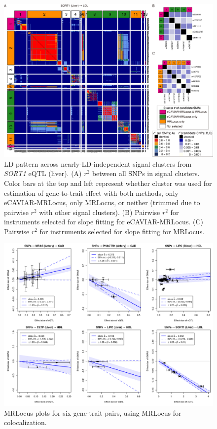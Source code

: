 \documentclass[11pt]{article}
\begin{document}
\begin{figure}[!ht]
  \centering
  \includegraphics[width=\textwidth]{figs/region/heatmap_eQTLbase.Liver_SORT1_LDL.20210114.png}
  \caption{LD pattern across nearly-LD-independent signal clusters
    from \emph{SORT1} eQTL (liver).
    (A) $r^2$ between all SNPs in signal clusters. Color bars at the
    top and left represent whether cluster was used for estimation of
    gene-to-trait effect with both methods, only eCAVIAR-MRLocus, only
    MRLocus, or neither (trimmed due to pairwise $r^2$ with other
    signal clusters). (B) Pairwise $r^2$ for instruments selected for
    slope fitting for eCAVIAR-MRLocus. (C) Pairwise $r^2$ for
    instruments selected for slope fitting for MRLocus.}
\end{figure}

\begin{figure}[!ht]
  \centering
  \includegraphics[width=\textwidth]{figs/real_loci_mrlocus.png}
  \caption{MRLocus plots for six gene-trait pairs, using MRLocus for colocalization.}
\end{figure}
\end{document}
